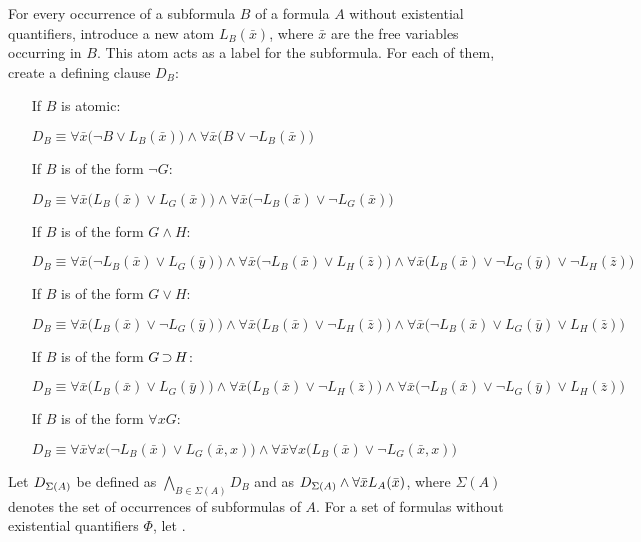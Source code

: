 \begin{defi}
	For every occurrence of a subformula $B$ of a formula $A$ without existential quantifiers, introduce a new atom $L_B(\bar x)$, where $\bar x$ are the free variables occurring in $B$.
	This atom acts as a label for the subformula. 
	For each of them, create a defining clause $D_B$:

	\begin{itemize}
		\item[If $B$ is atomic:]~

			$D_B\equiv \forall \bar x \big(\lnot B \lor L_B(\bar x)\big) \land \forall \bar x \big(B \lor \lnot L_B(\bar x)\big)  $
		\item[If $B$ is of the form $\lnot G$:]~

			$D_B\equiv \forall \bar x \big(L_B(\bar x) \lor L_G(\bar x)\big) \land \forall \bar x \big(\lnot L_B(\bar x) \lor \lnot L_G(\bar x)\big)$
		\item[If $B$ is of the form $G \land H$:]~

			$D_B\equiv \forall \bar x \big(\lnot L_B(\bar x) \lor L_G(\bar y)\big) \land \forall \bar x \big(\lnot L_B(\bar x) \lor L_H(\bar z)\big) \land \forall \bar x \big(L_B(\bar x) \lor \lnot L_G(\bar y) \lor \lnot L_H(\bar z)\big)  $
		\item[If $B$ is of the form $G \lor H$:]~

			$D_B\equiv \forall \bar x \big(L_B(\bar x) \lor \lnot L_G(\bar y)\big) \land \forall \bar x \big(L_B(\bar x) \lor \lnot L_H(\bar z)\big) \land \forall \bar x \big(\lnot L_B(\bar x) \lor L_G(\bar y) \lor L_H(\bar z)\big)$
		\item[If $B$ is of the form $G \operatorname{\supset} H$:]~

			$D_B\equiv \forall \bar x \big(L_B(\bar x) \lor L_G(\bar y)\big) \land
			\forall \bar x \big(L_B(\bar x) \lor \lnot L_H(\bar z)\big) \land \forall \bar x \big(\lnot L_B(\bar x) \lor \lnot L_G(\bar y) \lor L_H(\bar z)\big)  $
		\item[If $B$ is of the form $\forall x G$:]~

			$D_B\equiv \forall \bar x \forall x \big(\lnot L_B(\bar x) \lor L_G(\bar x, x)\big) \land \forall \bar x \forall x \big(L_B(\bar x) \lor \lnot L_G(\bar x, x)\big)$
	\end{itemize}

	Let $D_{\Sigma(A)}$ be defined as $\bigwedge_{B \in \Sigma(A)} D_B$ and
	 as $D_{\Sigma(A)} \land \forall \bar x L_A(\bar x)$, where $\Sigma(A)$ denotes the set of occurrences of subformulas of $A$.
	For a set of formulas without existential quantifiers $\Phi$, let .
\end{defi}

